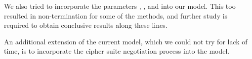 \documentclass[runningheads, envcountsame, a4paper, draft, x11names]{llncs}
\begin{document}
We also tried to incorporate the parameters \mCi, \mCr, and \mAD{} into our model. This too resulted in non-termination for some of the methods, and further study is required to obtain conclusive results along these lines. 

An additional extension of the current model, which we could not try for lack of time, is to incorporate the cipher suite negotiation process into the model.\\ 
%




%
% 
\end{document}
